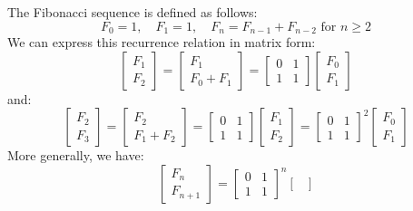 \begin{eg}
    The Fibonacci sequence is defined as follows:
    \[
        F_0 = 1, \quad F_1 = 1, \quad F_n = F_{n-1} + F_{n-2} \text{ for } n \geq 2
    \]
    We can express this recurrence relation in matrix form:
    \[
        \begin{bmatrix}
            F_1 \\ F_2
        \end{bmatrix} = \begin{bmatrix}
            F_1 \\ F_0 + F_1
        \end{bmatrix} = \begin{bmatrix}
            0 & 1 \\ 1 & 1
        \end{bmatrix} \begin{bmatrix}
            F_0 \\ F_1
        \end{bmatrix}
    \]
    and:
    \[
        \begin{bmatrix}
            F_2 \\ F_3
        \end{bmatrix} = \begin{bmatrix}
            F_2 \\ F_1 + F_2
        \end{bmatrix} = \begin{bmatrix}
            0 & 1 \\ 1 & 1
        \end{bmatrix} \begin{bmatrix}
            F_1 \\ F_2
        \end{bmatrix} = \begin{bmatrix}
            0 & 1 \\ 1 & 1
        \end{bmatrix}^2 \begin{bmatrix}
            F_0 \\ F_1
        \end{bmatrix}
    \]
    More generally, we have:
    \[\begin{bmatrix}
        F_n \\ F_{n+1}
    \end{bmatrix} = \begin{bmatrix}
        0 & 1 \\ 1 & 1
    \end{bmatrix}^n \begin{bmatrix}

\end{bmatrix}\]
\end{eg}
